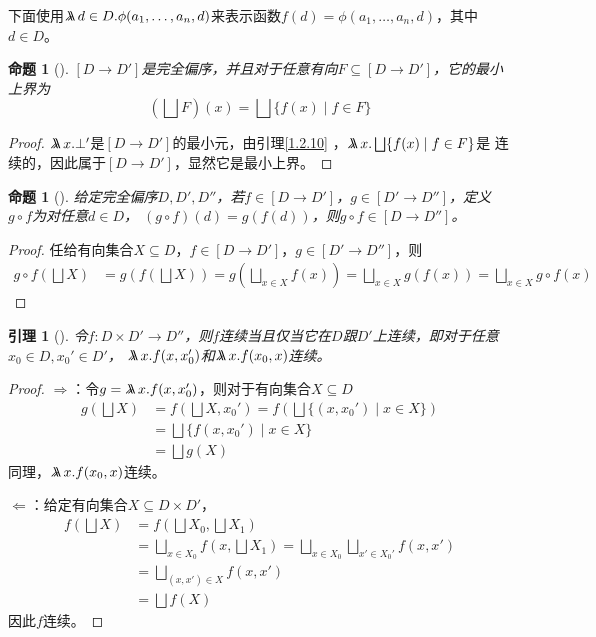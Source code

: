 \documentclass{jams-l}
\newtheorem{proposition}[theorem]{命题}
\newtheorem{lemma}[theorem]{引理}
\begin{document}
下面使用\(\metalambda d\in D.\phi(a_1,\dots,a_n,d)\)来表示函数\(f(d)=\phi(a_1,\dots,a_n,d)\)，其中\(d\in D\)。

\begin{proposition}[]
\label{1.2.11}
\([D\to D']\)是完全偏序，并且对于任意有向\(F\subseteq[D\to D']\)，它的最小上界为
\begin{equation*}
(\bigsqcup F)(x)=\bigsqcup\{f(x)\mid f\in F\}
\end{equation*}
\end{proposition}

\begin{proof}
\(\metalambda x.\bot'\)是\([D\to D']\)的最小元，由引理\ref{1.2.10} ，\(\metalambda x.\bigsqcup\{f(x)\mid f\in F\}\)是
连续的，因此属于\([D\to D']\)，显然它是最小上界。
\end{proof}

\begin{proposition}[]
给定完全偏序\(D,D',D''\)，若\(f\in[D\to D']\)，\(g\in[D'\to D'']\)，定义\(g\circ f\)为对任意\(d\in D\)，
\((g\circ f)(d)=g(f(d))\)，则\(g\circ f\in[D\to D'']\)。
\end{proposition}

\begin{proof}
任给有向集合\(X\subseteq D\)，\(f\in[D\to D']\)，\(g\in[D'\to D'']\)，则
\begin{align*}
g\circ f(\bigsqcup X)&=g(f(\bigsqcup X))=g(\bigsqcup_{x\in X} f(x))=\bigsqcup_{x\in X}g(f(x))=\bigsqcup_{x\in X} g\circ f(x)
\end{align*}
\end{proof}


\begin{lemma}[]
\label{1.2.12}
令\(f:D\times D'\to D''\)，则\(f\)连续当且仅当它在\(D\)跟\(D'\)上连续，即对于任意\(x_0\in D,x_0'\in D'\)，
\(\metalambda x.f(x,x_0')\)和\(\metalambda x.f(x_0,x)\)连续。
\end{lemma}

\begin{proof}
\(\Rightarrow\)：令\(g=\metalambda x.f(x,x_0')\)，则对于有向集合\(X\subseteq D\)
\begin{align*}
g(\bigsqcup X)&=f(\bigsqcup X,x_0')=f(\bigsqcup\{(x,x_0')\mid x\in X\})\\
&=\bigsqcup\{f(x,x_0')\mid x\in X\}\\
&=\bigsqcup g(X)
\end{align*}
同理，\(\metalambda x.f(x_0,x)\)连续。

\(\Leftarrow\)：给定有向集合\(X\subseteq D\times D'\)，
\begin{align*}
f(\bigsqcup X)&=f(\bigsqcup X_0,\bigsqcup X_1)\\
&=\bigsqcup_{x\in X_0}f(x,\bigsqcup X_1)=\bigsqcup_{x\in X_0}\bigsqcup_{x'\in X_0'}f(x,x')\\
&=\bigsqcup_{(x,x')\in X}f(x,x')\\
&=\bigsqcup f(X)
\end{align*}
因此\(f\)连续。
\end{proof}
\end{document}
